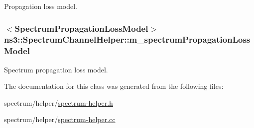 Propagation loss model. 

\subsubsection[{\texorpdfstring{m\+\_\+spectrum\+Propagation\+Loss\+Model}{m_spectrumPropagationLossModel}}]{$<${\bf Spectrum\+Propagation\+Loss\+Model}$>$ ns3\+::\+Spectrum\+Channel\+Helper\+::m\+\_\+spectrum\+Propagation\+Loss\+Model\hspace{0.3cm}{\ttfamily [private]}}\hypertarget{classns3_1_1SpectrumChannelHelper_aebb1688f743b28b8dbfe8161de4ebc65}{}\label{classns3_1_1SpectrumChannelHelper_aebb1688f743b28b8dbfe8161de4ebc65}


Spectrum propagation loss model. 



The documentation for this class was generated from the following files\+:\begin{DoxyCompactItemize}
\item 
spectrum/helper/\hyperlink{spectrum-helper_8h}{spectrum-\/helper.\+h}\item 
spectrum/helper/\hyperlink{spectrum-helper_8cc}{spectrum-\/helper.\+cc}\end{DoxyCompactItemize}
